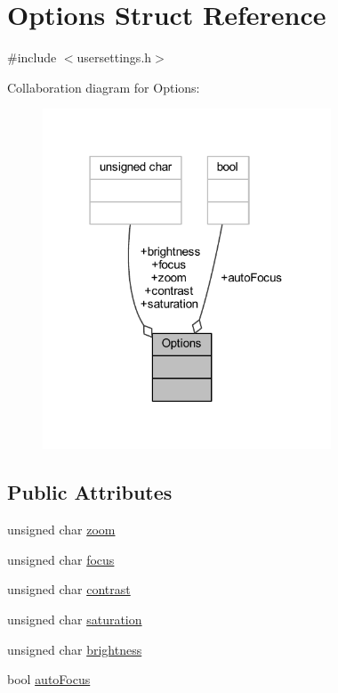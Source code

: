 \hypertarget{struct_options}{}\section{Options Struct Reference}
\label{struct_options}


{\ttfamily \#include $<$usersettings.\+h$>$}



Collaboration diagram for Options\+:\nopagebreak
\begin{figure}[H]
\begin{center}
\leavevmode
\includegraphics[width=243pt]{struct_options__coll__graph}
\end{center}
\end{figure}
\subsection*{Public Attributes}
\begin{DoxyCompactItemize}
\item 
unsigned char \mbox{\hyperlink{struct_options_adfa04ac8009b74b40fc38595bc9a2dd0}{zoom}}
\item 
unsigned char \mbox{\hyperlink{struct_options_a444d9527822f32e094907b1a8aa88d35}{focus}}
\item 
unsigned char \mbox{\hyperlink{struct_options_a983362fb0677019296772367eb16dca1}{contrast}}
\item 
unsigned char \mbox{\hyperlink{struct_options_a789c6ab9b7f014b3cae84efbf1646e83}{saturation}}
\item 
unsigned char \mbox{\hyperlink{struct_options_add944f0eb9d34b2beb6ffe7a8c7797f7}{brightness}}
\item 
bool \mbox{\hyperlink{struct_options_aab21de2c0338e19de5bf8f6f2c1e5fb6}{auto\+Focus}}
\end{DoxyCompactItemize}


